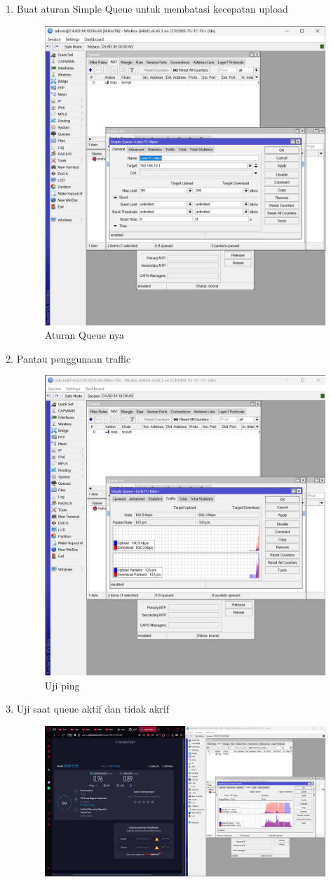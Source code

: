 \begin{enumerate}
    \item Buat aturan Simple Queue untuk membatasi kecepatan upload
    \begin{figure}[H]
        \centering
        \includegraphics[width=0.5\linewidth]{P1/img/12.png}
        \caption{Aturan Queue nya}
        \label{fig:gambar4}
    \end{figure}
    \item Pantau penggunaan traffic
    \begin{figure}[H]
        \centering
        \includegraphics[width=0.5\linewidth]{P1/img/13.png}
        \caption{Uji ping}
        \label{fig:gambar4}
    \end{figure}
    \item Uji saat queue aktif dan tidak akrif
    \begin{figure}[H]
        \centering
        \includegraphics[width=0.5\linewidth]{P1/img/14.png}

\end{figure}
\end{enumerate}
